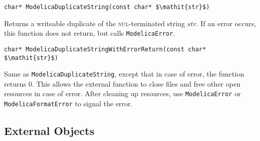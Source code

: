 \begin{functiondefinition}[ModelicaDuplicateString]
\begin{synopsis}[C]\begin{lstlisting}
char* ModelicaDuplicateString(const char* $\mathit{str}$)
\end{lstlisting}\end{synopsis}
\begin{semantics}
Returns a writeable duplicate of the \textsc{nul}-terminated string $\mathit{str}$.
If an error occurs, this function does not return, but calls {\lstinline[language=C]!ModelicaError!}.
\end{semantics}
\end{functiondefinition}

\begin{functiondefinition}[ModelicaDuplicateStringWithErrorReturn]
\begin{synopsis}[C]\begin{lstlisting}
char* ModelicaDuplicateStringWithErrorReturn(const char* $\mathit{str}$)
\end{lstlisting}\end{synopsis}
\begin{semantics}
Same as {\lstinline[language=C]!ModelicaDuplicateString!}, except that in case of error, the function returns 0.
This allows the external function to close files and free other open resources in case of error.
After cleaning up resources, use {\lstinline[language=C]!ModelicaError!} or {\lstinline[language=C]!ModelicaFormatError!} to signal the error.
\end{semantics}
\end{functiondefinition}

\subsection{External Objects}\label{external-objects}

